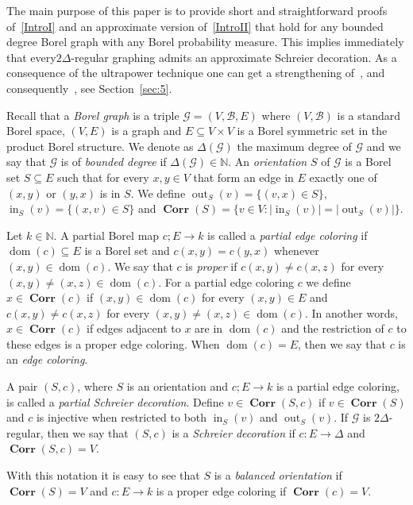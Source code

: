 \documentclass[AHL,Unicode,longabstracts,published]{cedram}
\DeclareMathOperator{\Corr}{\mathbf{Corr}}
\DeclareMathOperator{\out}{out}
\DeclareMathOperator{\inn}{in}
\DeclareMathOperator{\dom}{dom}
\newcommand{\clG}{\mathcal{G}}
\newcommand{\clB}{\mathcal{B}}
\newcommand{\bbZ}{\mathbb{N}}
\newcommand{\clG}{\mathcal{G}}
\begin{document}
The main purpose of this paper is to provide short and straightforward proofs of~\eqref{IntroI} and an approximate version of~\eqref{IntroII} that hold for any bounded degree Borel graph with any Borel probability measure. This implies immediately that every\linebreak $2\Delta$-regular graphing admits an approximate Schreier decoration. As a consequence of the ultrapower technique one can get a strengthening of~\cite[Corollary~4]{Laszlo}, and consequently~\cite[Theorem~1]{Laszlo}, see Section~\ref{sec:5}.

Recall that a \emph{Borel graph} is a triple $\clG=(V,\clB,E)$ where $(V,\clB)$ is a standard Borel space, $(V,E)$ is a graph and $E\subseteq V\times V$ is a Borel symmetric set in the product Borel structure. We denote as $\Delta(\clG)$ the maximum degree of $\clG$ and we say that $\clG$ is of \emph{bounded degree} if $\Delta(\clG)\in \bbZ$. An \emph{orientation} $S$ of $\clG$ is a Borel set $S\subseteq E$ such that for every $x,y\in V$ that form an edge in $E$ exactly one of $(x,y)$ or $(y,x)$ is in $S$. We define $\out_S(v)=\{(v,x)\in S\}$, $\inn_S(v)=\{(x,v)\in S\}$ and $\Corr(S)=\{v\in V:|\inn_S(v)|=|\out_S(v)|\}$.

Let $k\in \bbZ$. A partial Borel map $c;E\to k$ is called a \emph{partial edge coloring} if $\dom(c)\subseteq E$ is a Borel set and $c(x,y)=c(y,x)$ whenever $(x,y)\in \dom(c)$. We say that $c$ is \emph{proper} if $c(x,y)\not =c(x,z)$ for every $(x,y)\not=(x,z)\in \dom(c)$. For a partial edge coloring $c$ we define $x\in \Corr(c)$ if $(x,y)\in\dom(c)$ for every $(x,y)\in E$ and $c(x,y)\not =c(x,z)$ for every $(x,y)\not=(x,z)\in \dom(c)$. In another words, $x\in \Corr(c)$ if edges adjacent to $x$ are in $\dom(c)$ and the restriction of $c$ to these edges is a proper edge coloring. When $\dom(c)=E$, then we say that $c$ is an \emph{edge coloring}.

A pair $(S,c)$, where $S$ is an orientation and $c;E\to k$ is a partial edge coloring, is called a \emph{partial Schreier decoration}. Define $v\in \Corr(S,c)$ if $v\in \Corr(S)$ and $c$ is injective when restricted to both $\inn_S(v)$ and $\out_S(v)$. If $\clG$ is $2\Delta$-regular, then we say that $(S,c)$ is a \emph{Schreier decoration} if $c:E\to \Delta$ and $\Corr(S,c)=V$.

With this notation it is easy to see that $S$ is a \emph{balanced orientation} if $\Corr(S)=V$ and $c:E\to k$ is a proper edge coloring if $\Corr(c)=V$.
\end{document}
